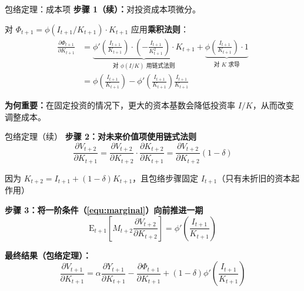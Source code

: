 \documentclass{beamer}
\begin{document}
\begin{frame}{包络定理：成本项}
    \textbf{步骤 1（续）：}对投资成本项微分。

    对 $\Phi_{t+1} = \phi(I_{t+1}/K_{t+1}) \cdot K_{t+1}$ 应用\textbf{乘积法则}：
    \begin{equation*}
        \begin{aligned}
            \frac{\partial \Phi_{t+1}}{\partial K_{t+1}} &= \underbrace{\phi'\!\left(\tfrac{I_{t+1}}{K_{t+1}}\right) \cdot \left(-\tfrac{I_{t+1}}{K_{t+1}^2}\right) \cdot K_{t+1}}_{\text{对 } \phi(I/K) \text{ 用链式法则}} + \underbrace{\phi\!\left(\tfrac{I_{t+1}}{K_{t+1}}\right) \cdot 1}_{\text{对 } K \text{ 求导}} \\
            &= \phi\!\left(\tfrac{I_{t+1}}{K_{t+1}}\right) - \phi'\!\left(\tfrac{I_{t+1}}{K_{t+1}}\right) \tfrac{I_{t+1}}{K_{t+1}}
        \end{aligned}
    \end{equation*}

    \vspace{4pt}
    \textbf{为何重要：}在固定投资的情况下，更大的资本基数会降低投资率 $I/K$，从而改变调整成本。
\end{frame}

\begin{frame}{包络定理（续）}
    \textbf{步骤 2：对未来价值项使用链式法则}
    \begin{equation*}
        \frac{\partial V_{t+2}}{\partial K_{t+1}} = \frac{\partial V_{t+2}}{\partial K_{t+2}} \cdot \frac{\partial K_{t+2}}{\partial K_{t+1}} = \frac{\partial V_{t+2}}{\partial K_{t+2}} (1-\delta)
    \end{equation*}

    因为 $K_{t+2} = I_{t+1} + (1-\delta)K_{t+1}$，且包络步骤固定 $I_{t+1}$（只有未折旧的资本起作用）


    \textbf{步骤 3：将一阶条件（\ref{equ:marginal}）向前推进一期}
    \begin{equation*}
        \mathrm{E}_{t+1}\left[M_{t+2} \frac{\partial V_{t+2}}{\partial K_{t+2}}\right] = \phi'\left(\frac{I_{t+1}}{K_{t+1}}\right)
    \end{equation*}


    \textbf{最终结果（包络定理）：}
    \begin{equation}\label{equ:envelope theorem}
        \boxed{
        \frac{\partial V_{t+1}}{\partial K_{t+1}} = \alpha \frac{\partial Y_{t+1}}{\partial K_{t+1}} - \frac{\partial \Phi_{t+1}}{\partial K_{t+1}} + (1-\delta) \phi'\left(\frac{I_{t+1}}{K_{t+1}}\right)
        }
    \end{equation}
\end{frame}
\end{document}
